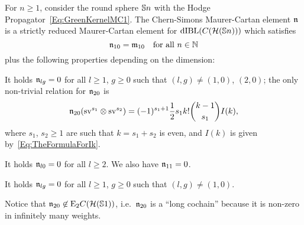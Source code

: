 \documentclass[\MainFolder/Text.tex]{subfiles}
\begin{document}
\begin{Proposition} \label{Proposition:MCSphere}
For $n\ge 1$, consider the round sphere $\mathbb{S}{n}$ with the Hodge Propagator~\eqref{Eq:GreenKernelMC1}. The Chern-Simons Maurer-Cartan element $\mathfrak{n}$ is a strictly reduced Maurer-Cartan element for $\mathrm{dIBL}(C(\mathcal{H}(\mathbb{S}{n})))$ which satisfies
\[ \mathfrak{n}_{10} = \mathfrak{m}_{10}\quad\text{for all }n\in \mathbb{N}\]
plus the following properties depending on the dimension:
\begin{description}[font=\normalfont\itshape]
 \item[($n = 1$):] It holds $\mathfrak{n}_{lg}=0$ for all $l\ge 1$, $g\ge 0$ such that $(l,g) \neq (1,0)$, $(2,0)$; the only non-trivial relation for $\mathfrak{n}_{20}$ is
  \begin{equation}\label{Eq:MC20}
  \mathfrak{n}_{20}(\mathrm{s} \mathrm{v}^{s_1}\otimes  \mathrm{s} \mathrm{v}^{s_2}) = (-1)^{s_1+1} \frac{1}{2} s_1 k! \binom{k-1}{s_1} I(k),
  \end{equation}
  where $s_1$, $s_2\ge 1$ are such that $k = s_1 + s_2$ is even, and $I(k)$ is given by~\eqref{Eq:TheFormulaForIk}.
 \item[($n=2$):] It holds $\mathfrak{n}_{l0}=0$ for all $l\ge 2$. We also have $\mathfrak{n}_{11}=0$.
 \item[($n\ge 3$):] It holds $\mathfrak{n}_{lg} = 0$ for all $l\ge 1$, $g\ge 0$ such that $(l,g) \neq (1,0)$.
\end{description}
\end{Proposition}

Notice that $\mathfrak{n}_{20}\not\in \mathrm{E}_2 C(\mathcal{H}(\mathbb{S}{1}))$, i.e.~$\mathfrak{n}_{20}$ is a ``long cochain'' because it is non-zero in infinitely many weights.
\end{document}

